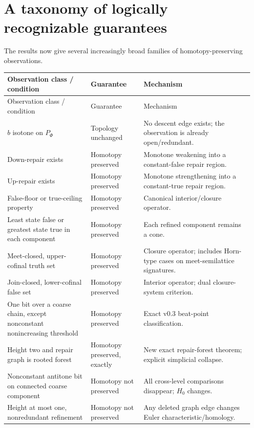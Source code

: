 \documentclass[11pt]{article}
\theoremstyle{definition}
\begin{document}
\section{A taxonomy of logically recognizable guarantees}

The results now give several increasingly broad families of homotopy-preserving observations.

\begin{longtable}{>{\raggedright\arraybackslash}p{}>{\raggedright\arraybackslash}p{}>{\raggedright\arraybackslash}p{}}
\toprule
Observation class / condition & Guarantee & Mechanism \\
\midrule
\endfirsthead
\toprule
Observation class / condition & Guarantee & Mechanism \\
\midrule
\endhead
$b$ isotone on $P_\Phi$ & Topology unchanged & No descent edge exists; the observation is already open/redundant. \\
Down-repair exists & Homotopy preserved & Monotone weakening into a constant-false repair region. \\
Up-repair exists & Homotopy preserved & Monotone strengthening into a constant-true repair region. \\
False-floor or true-ceiling property & Homotopy preserved & Canonical interior/closure operator. \\
Least state false or greatest state true in each component & Homotopy preserved & Each refined component remains a cone. \\
Meet-closed, upper-cofinal truth set & Homotopy preserved & Closure operator; includes Horn-type cases on meet-semilattice signatures. \\
Join-closed, lower-cofinal false set & Homotopy preserved & Interior operator; dual closure-system criterion. \\
One bit over a coarse chain, except nonconstant nonincreasing threshold & Homotopy preserved & Exact v0.3 beat-point classification. \\
Height two and repair graph is rooted forest & Homotopy preserved, exactly & New exact repair-forest theorem; explicit simplicial collapse. \\
Nonconstant antitone bit on connected coarse component & Homotopy not preserved & All cross-level comparisons disappear; $H_0$ changes. \\
Height at most one, nonredundant refinement & Homotopy not preserved & Any deleted graph edge changes Euler characteristic/homology. \\
\bottomrule
\end{longtable}
\end{document}
